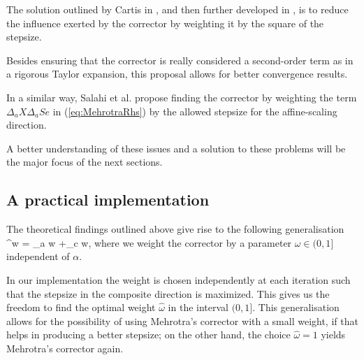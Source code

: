 The solution outlined by Cartis in \cite{Cartis04}, and then further 
developed in \cite{Cartis05}, is to reduce the influence exerted by 
the corrector by weighting it by the square of the stepsize. 

Besides ensuring that the corrector is really considered 
a second-order term as in a rigorous Taylor expansion, 
this proposal allows for better convergence results.


In a similar way, Salahi et al. \cite{SalahiPengTerlaky} propose finding 
the corrector by weighting the term $\Delta_a X \Delta_a S e$ in 
(\ref{eq:MehrotraRhs}) by the allowed stepsize for the affine-scaling 
direction.


A better understanding of these issues and a solution to these
problems will be the major focus of the next sections.

%
%
\subsection{A practical implementation}


The theoretical findings 
outlined above give rise to the following generalisation
\be  \label{eq:WeightedDirection}
  \Delta^\omega w = \Delta_a w +\omega\Delta_c w,
\ee
where we weight the corrector by a parameter $\omega\in(0,1]$ 
independent of $\alpha$.

In our implementation the weight is chosen independently at each 
iteration such that the stepsize in the composite direction 
is maximized. This gives us the freedom to find the optimal weight 
$\hat\omega$ in the interval $(0,1]$. 
%
This generalisation allows for the possibility of using Mehrotra's 
corrector with a small weight, if that helps in producing a better
stepsize; on the other hand, 
the choice $\hat\omega=1$ yields Mehrotra's corrector again. 

